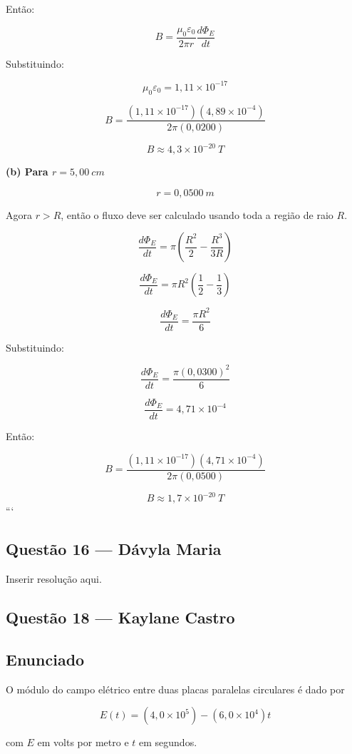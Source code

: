 \documentclass[12pt,a4paper]{article}
\begin{document}
Então:

\[
B=
\frac{\mu_0\varepsilon_0}{2\pi r}
\frac{d\Phi_E}{dt}
\]

Substituindo:

\[
\mu_0\varepsilon_0
=
1,11\times10^{-17}
\]

\[
B=
\frac{(1,11\times10^{-17})(4,89\times10^{-4})}
{2\pi(0,0200)}
\]

\[
B\approx4,3\times10^{-20}\ T
\]

\vspace{0.5cm}

\textbf{(b) Para \(r=5,00\ cm\)}

\[
r=0,0500\ m
\]

Agora \(r>R\), então o fluxo deve ser calculado usando toda a região de raio \(R\).

\[
\frac{d\Phi_E}{dt}
=
\pi
\left(
\frac{R^2}{2}
-
\frac{R^3}{3R}
\right)
\]

\[
\frac{d\Phi_E}{dt}
=
\pi R^2
\left(
\frac12-\frac13
\right)
\]

\[
\frac{d\Phi_E}{dt}
=
\frac{\pi R^2}{6}
\]

Substituindo:

\[
\frac{d\Phi_E}{dt}
=
\frac{\pi(0,0300)^2}{6}
\]

\[
\frac{d\Phi_E}{dt}
=
4,71\times10^{-4}
\]

Então:

\[
B=
\frac{(1,11\times10^{-17})(4,71\times10^{-4})}
{2\pi(0,0500)}
\]

\[
B\approx1,7\times10^{-20}\ T
\]
```


\subsection{Questão 16 — Dávyla Maria}
Inserir resolução aqui.

\subsection{Questão 18 — Kaylane Castro}
\subsection*{Enunciado}

O módulo do campo elétrico entre duas placas paralelas circulares é dado por

\[
E(t) = (4,0\times10^5) - (6,0\times10^4)t
\]

com $E$ em volts por metro e $t$ em segundos.
\end{document}
